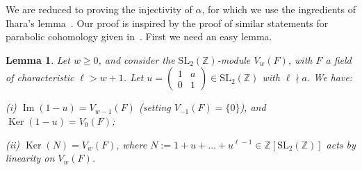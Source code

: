 \documentclass{amsart}
\theoremstyle{plain}
\newtheorem{lemma}[theorem]{Lemma}
\theoremstyle{definition}
\numberwithin{equation}{section}
\newcommand{\Z}{{\mathbb Z}}
\def\im{\operatorname{Im}} \def\ker{\operatorname{Ker}} \def\stab{\operatorname{Stab }}
\def\SL{\mathrm{SL}} \def\PSL{\mathrm{PSL}}\def\GL{\mathrm{GL}}\def\PGL{\mathrm{PGL}}
\def\a{\alpha}\def\b{\beta}\def\g{\gamma}
\def\sm#1#2#3#4{\left(\begin{smallmatrix}#1&#2 \\ #3 & #4 \end{smallmatrix}\right)}
\begin{document}
We are reduced to proving the injectivity of $\a$, for which we use the 
ingredients of Ihara's lemma~\cite[Lemma 3.2]{Ih}. Our proof is inspired by
the proof of similar statements for parabolic cohomology given 
in~\cite{Ri,Di}. First we need an easy lemma.
\begin{lemma}\label{L3}Let $w\ge 0$, and
consider the $\SL_2(\Z)$-module $V_w(F)$, with $F$ a field of characteristic 
$\ell>w+1$. Let $u=\sm 1a01\in \SL_2(\Z)$ with $\ell\nmid a$. We have:
 
\emph{\phantom{i}(i)} $\im(1-u)=V_{w-1}(F)$ (setting $V_{-1}(F)=\{0\}$), and $\ker(1-u)=V_0(F)$; 

\emph{(ii)} $\ker(N)=V_w(F)$, where $N:=1+u+\ldots+u^{\ell-1}\in \Z[\SL_2(\Z)]$ acts by linearity
on $V_w(F)$. 
\end{lemma}
\end{document}

